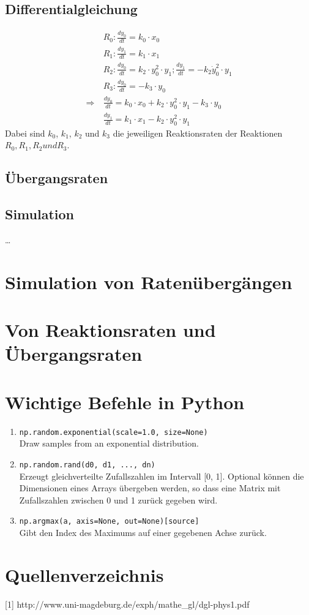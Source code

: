 \documentclass{scrartcl}
\begin{document}
\subsection{Differentialgleichung}

\begin{align*}
    &~ R_0: \frac{dy_0}{dt} = k_0 \cdot x_0 \\
    &~ R_1: \frac{dy_1}{dt} = k_1 \cdot x_1 \\
    &~ R_2: \frac{dy_0}{dt} = k_2 \cdot y_0^2 \cdot y_1;  \frac{dy_1}{dt} = -k_2 \dot y_0^2 \cdot y_1 \\
    &~ R_3: \frac{dy_0}{dt} = -k_3 \cdot y_0\\
    \Rightarrow &~ \frac{dy_0}{dt} = k_0 \cdot x_0 + k_2 \cdot y_0^2\cdot y_1 - k_3 \cdot y_0 \\
    &~ \frac{dy_1}{dt} = k_1 \cdot x_1 - k_2 \cdot y_0^2 \cdot y_1
\end{align*}
Dabei sind $k_0$, $k_1$, $k_2$ und $k_3$ die jeweiligen Reaktionsraten der Reaktionen $R_0, R_1, R_2 und R_3$.









\subsection{Übergangsraten}
\subsection{Simulation}
\dots 
\section{Simulation von Ratenübergängen}
\section{Von Reaktionsraten und Übergangsraten}
\newpage
\section{Wichtige Befehle in Python}
\begin{enumerate}
\item \lstinline[]{np.random.exponential(scale=1.0, size=None)} \\
Draw samples from an exponential distribution. 
\item \lstinline[]{np.random.rand(d0, d1, ..., dn)} \\
Erzeugt gleichverteilte Zufallszahlen im Intervall [0, 1]. Optional können die Dimensionen eines Arrays übergeben werden, so dass eine Matrix mit Zufallszahlen zwischen 0 und 1 zurück gegeben wird. 
\item \lstinline[]{np.argmax(a, axis=None, out=None)[source]} \\
Gibt den Index des Maximums auf einer gegebenen Achse zurück.
\end{enumerate}

\newpage
\section{Quellenverzeichnis}
[1] http://www.uni-magdeburg.de/exph/mathe\_gl/dgl-phys1.pdf
\end{document}
